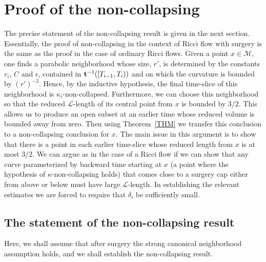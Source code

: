 \chapter{Proof of the non-collapsing}
\label{chap:proof-noncollapsing}
\label{sectnoncoll}

The precise statement of the non-collapsing result is given in the
next section. Essentially, the proof of non-collapsing in the
context of Ricci flow with surgery is the same as the proof in the
case of ordinary Ricci flows. Given a point $x\in {\mathcal M}$, one
finds a parabolic neighborhood whose size, $r'$, is determined by
the constants $r_i$, $C$ and $\epsilon$, contained in ${\bf
t}^{-1}([T_{i-1},T_i))$ and on which the curvature is bounded by
$(r')^{-2}$. Hence, by the inductive hypothesis, the final
time-slice of this neighborhood is $\kappa_i$-non-collapsed.
Furthermore, we can choose this neighborhood so that the reduced
${\mathcal L}$-length of its central point from $x$ is bounded by
$3/2$. This allows us to produce an open subset at an earlier time
whose reduced volume is bounded away from zero. Then using
Theorem~\ref{THM} we transfer this conclusion to a non-collapsing
conclusion for $x$. The main issue in this argument is to show that
there is a point in each earlier time-slice whose reduced length
from $x$ is at most $3/2$. We can argue as in the case of a Ricci
flow if we can show that any curve parameterized by backward time
starting at $x$ (a point where the hypothesis of
$\kappa$-non-collapsing holds) that comes close to  a surgery cap
either from above or below must have large ${\mathcal L}$-length. In
establishing the relevant estimates we are forced to require that
$\delta_i$ be sufficiently small.


\section{The statement of the non-collapsing result}

Here, we shall assume that after surgery the strong canonical
neighborhood assumption holds, and we shall establish the
non-collapsing result.

